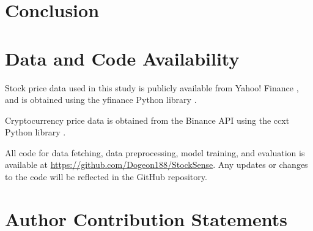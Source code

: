 \documentclass[conference]{IEEEtran}
\begin{document}
\section{Conclusion}


\section{Data and Code Availability}

Stock price data used in this study is publicly available from Yahoo! Finance \cite{yahoofinance}, and is obtained using the yfinance Python library \cite{yfinance}.

Cryptocurrency price data is obtained from the Binance API \cite{binanceapi} using the ccxt Python library \cite{ccxt}.

All code for data fetching, data preprocessing, model training, and evaluation is available at \url{https://github.com/Dogeon188/StockSense}. Any updates or changes to the code will be reflected in the GitHub repository.

\section{Author Contribution Statements}




\end{document}
